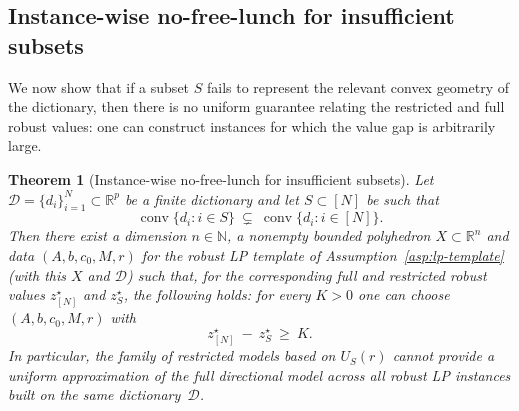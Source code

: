\documentclass[accepted]{uai2026}
\theoremstyle{plain}
\newtheorem{theorem}{Theorem}[section]
\theoremstyle{definition}
\theoremstyle{remark}
\newcommand{\R}{\mathbb{R}}
\DeclareMathOperator{\conv}{conv}
\begin{document}
\subsection{Instance-wise no-free-lunch for insufficient subsets}

We now show that if a subset $S$ fails to represent the relevant convex
geometry of the dictionary, then there is no uniform guarantee relating the
restricted and full robust values: one can construct instances for which the
value gap is arbitrarily large.

\begin{theorem}[Instance-wise no-free-lunch for insufficient subsets]
\label{thm:nofreelunch-instance}
Let $\mathcal D=\{d_i\}_{i=1}^N\subset\R^p$ be a finite dictionary and
let $S\subset[N]$ be such that
\[
\conv\{d_i : i\in S\}\ \subsetneq\ \conv\{d_i : i\in[N]\}.
\]
Then there exist a dimension $n\in\mathbb{N}$, a nonempty bounded polyhedron
$X\subset\R^n$ and data $(A,b,c_0,M,r)$ for the robust LP template of
Assumption~\ref{asp:lp-template} (with this $X$ and $\mathcal D$) such that,
for the corresponding full and restricted robust values $z_{[N]}^\star$ and
$z_S^\star$, the following holds: for every $K>0$ one can choose
$(A,b,c_0,M,r)$ with
\[
z_{[N]}^\star\ -\ z_S^\star\ \ge\ K.
\]
In particular, the family of restricted models based on $U_S(r)$ cannot provide
a uniform approximation of the full directional model across all robust LP
instances built on the same dictionary~$\mathcal D$.
\end{theorem}
\end{document}
